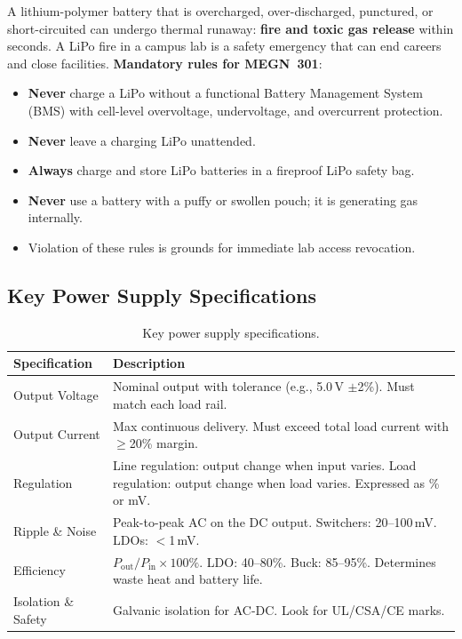 \begin{warningbox}
A lithium-polymer battery that is overcharged, over-discharged, punctured, or short-circuited can undergo thermal runaway: \textbf{fire and toxic gas release} within seconds. A LiPo fire in a campus lab is a safety emergency that can end careers and close facilities. \textbf{Mandatory rules for MEGN~301}:
\begin{itemize}[nosep,leftmargin=1.5em]
\item \textbf{Never} charge a LiPo without a functional Battery Management System (BMS) with cell-level overvoltage, undervoltage, and overcurrent protection.
\item \textbf{Never} leave a charging LiPo unattended.
\item \textbf{Always} charge and store LiPo batteries in a fireproof LiPo safety bag.
\item \textbf{Never} use a battery with a puffy or swollen pouch; it is generating gas internally.
\item Violation of these rules is grounds for immediate lab access revocation.
\end{itemize}
\end{warningbox}

\subsection{Key Power Supply Specifications}
\label{sec:psu_specs}

\begin{table}[htbp]
\centering\small
\begin{tabularx}{\textwidth}{l X}
  \toprule
  \textbf{Specification} & \textbf{Description} \\
  \midrule
  Output Voltage & Nominal output with tolerance (e.g., 5.0\,V $\pm$2\%). Must match each load rail. \\
  Output Current & Max continuous delivery. Must exceed total load current with $\geq$20\% margin. \\
  Regulation & Line regulation: output change when input varies. Load regulation: output change when load varies. Expressed as \% or mV. \\
  Ripple \& Noise & Peak-to-peak AC on the DC output. Switchers: 20--100\,mV. LDOs: $<$1\,mV. \\
  Efficiency & $P_{\text{out}} / P_{\text{in}} \times 100\%$. LDO: 40--80\%. Buck: 85--95\%. Determines waste heat and battery life. \\
  Isolation \& Safety & Galvanic isolation for AC-DC. Look for UL/CSA/CE marks. \\
  \bottomrule
\end{tabularx}
\caption{Key power supply specifications.}
\end{table}

